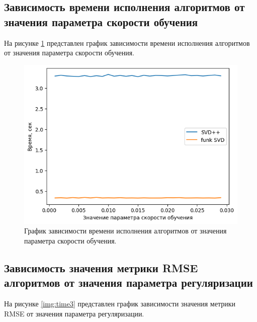 \subsection{Зависимость времени исполнения алгоритмов от значения параметра скорости обучения}

На рисунке \ref{img:time2} представлен график зависимости времени исполнения алгоритмов от значения параметра скорости обучения.

\begin{figure}[H]
	\centering
	\includegraphics[width=\textwidth]{inc/timesLr.png}
	\caption{ График зависимости времени исполнения алгоритмов от значения параметра скорости обучения.}
	\label{img:time2}
\end{figure}

\subsection{Зависимость значения метрики RMSE алгоритмов от значения параметра регуляризации}

На рисунке \ref{img:time3} представлен график зависимости значения метрики RMSE от значения параметра регуляризации.

